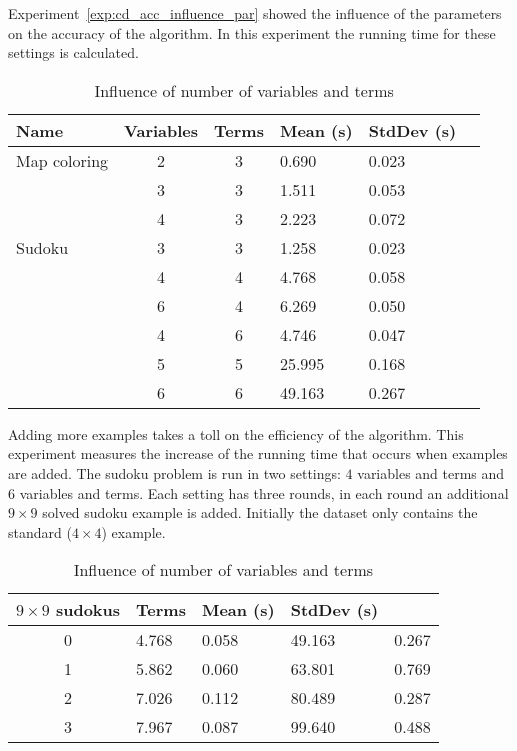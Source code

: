 \begin{experiment}
	Experiment~\ref{exp:cd_acc_influence_par} showed the influence of the parameters on the accuracy of the algorithm.
	In this experiment the running time for these settings is calculated.

	\begin{table}[!htp]
		\begin{tabularx}{\textwidth}{lcc|XXX}
			\textbf{Name} & \textbf{Variables} & \textbf{Terms}	& \textbf{Mean (s)} & \textbf{StdDev (s)} \\
			\toprule
			Map coloring 	& 2 & 3 & 0.690		& 0.023	\\
							& 3 & 3 & 1.511		& 0.053	\\
							& 4 & 3 & 2.223		& 0.072	\\
			\midrule	
			Sudoku 			& 3 & 3 & 1.258		& 0.023	\\
							& 4 & 4 & 4.768		& 0.058	\\
							& 6 & 4 & 6.269		& 0.050	\\
							& 4 & 6 & 4.746		& 0.047	\\
							& 5 & 5 & 25.995	& 0.168	\\
							& 6 & 6 & 49.163	& 0.267
		\end{tabularx}
		\label{tbl:cd_speed_influence}
		\caption{Influence of number of variables and terms}
	\end{table}

\end{experiment}

\begin{experiment}
	Adding more examples takes a toll on the efficiency of the algorithm.
	This experiment measures the increase of the running time that occurs when examples are added.
	The sudoku problem is run in two settings: $4$ variables and terms and $6$ variables and terms.
	Each setting has three rounds, in each round an additional $9 \times 9$ solved sudoku example is added.
	Initially the dataset only contains the standard ($4 \times 4$) example.

	\begin{table}[!htp]
		\begin{tabularx}{\textwidth}{c|XX|XX}
			\textbf{$9 \times 9$ sudokus} & \textbf{Terms}	& \textbf{Mean (s)} & \textbf{StdDev (s)} \\
			\toprule
			0 & 4.768 & 0.058	& 49.163	& 0.267	\\
			1 & 5.862 & 0.060	& 63.801	& 0.769	\\
			2 & 7.026 & 0.112	& 80.489	& 0.287	\\
			3 & 7.967 & 0.087	& 99.640	& 0.488	\\
		\end{tabularx}
		\label{tbl:cd_speed_examples}
		\caption{Influence of number of variables and terms}
	\end{table}
\end{experiment}

